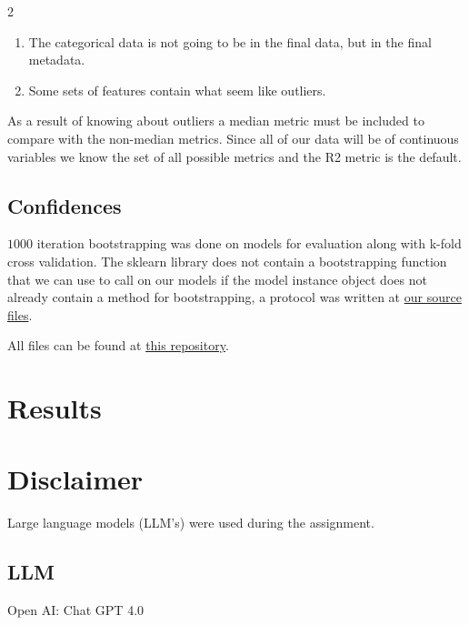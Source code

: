 \documentclass[12pt, a4paper]{article}
\begin{document}
\begin{multicols}{2}
    \begin{enumerate} \label{enm:metricReasons}
        \item The categorical data is not going to be in the final data, but in the final metadata.
        \item Some sets of features contain what seem like outliers.
    \end{enumerate}

    As a result of knowing about outliers a median metric must be included to compare with the non-median metrics. Since all of our data will be of continuous variables we know the set of all possible metrics and the R2 metric is the default.
    \newline

    \subsection{Confidences}

    $1000$ iteration bootstrapping was done on models for evaluation along with k-fold cross validation. The sklearn library does not contain a bootstrapping function that we can use to call on our models if the model instance object does not already contain a method for bootstrapping, a protocol was written at \href{https://github.com/ArisPodotas/Assignment-1-MLICB/blob/main/src/functions.py}{our source files}.
    \newline

    All files can be found at \href{https://github.com/ArisPodotas/Assignment-1-MLICB/tree/main}{this repository}.
    \newline

    \section{Results} \label{sec:res}

    \section{Disclaimer} \label{sec:disc}

    Large language models (LLM's) were used during the assignment.

    \subsection{LLM} \label{subsec:llms}

    Open AI: Chat GPT 4.0


\end{multicols}
\end{document}
